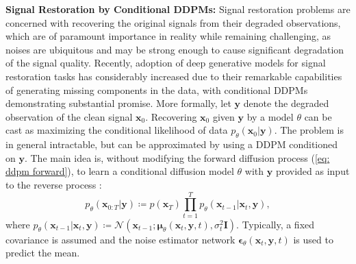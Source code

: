 \noindent\textbf{Signal Restoration by Conditional DDPMs:}
Signal restoration problems are concerned with recovering the original signals from their degraded observations, which are of paramount importance in reality while remaining challenging, as noises are ubiquitous and may be strong enough to cause significant degradation of the signal quality. Recently, adoption of deep generative models \citep{kingma2013auto,goodfellow2014generative,ho2020denoising} for signal restoration tasks has considerably increased due to their remarkable capabilities of generating missing components in the data, with conditional DDPMs \citep{croitoru2023diffusion,cao2024survey} demonstrating substantial promise. More formally, let $\mathbf{y}$ denote the degraded observation of the clean signal $\mathbf{x}_0$. Recovering $\mathbf{x}_0$ given $\mathbf{y}$ by a model $\theta$ can be cast as maximizing the conditional likelihood of data $p_\theta(\mathbf{x}_0|\mathbf{y})$. The problem is in general intractable, but can be approximated by using a DDPM conditioned on $\mathbf{y}$. The main idea is, without modifying the forward diffusion process (\ref{eq: ddpm forward}), to learn a conditional diffusion model $\theta$ with $\mathbf{y}$ provided as input to the reverse process \citep{ozdenizci2023restoring}:
\vspace{-0.2cm}
\begin{equation}
    p_\theta(\mathbf{x}_{0:T}|\mathbf{y})\coloneq p(\mathbf{x}_T)\prod_{t=1}^Tp_\theta(\mathbf{x}_{t-1}|\mathbf{x}_t,\mathbf{y}),
\label{eq: cddpm reverse}
\end{equation}
where $p_\theta(\mathbf{x}_{t-1}|\mathbf{x}_t,\mathbf{y})\coloneq\mathcal{N}(\mathbf{x}_{t-1};\boldsymbol{\mu}_\theta(\mathbf{x}_t,\mathbf{y},t), \sigma_t^2\mathbf{I})$.
Typically, a fixed covariance is assumed and the noise estimator network $\boldsymbol{\epsilon}_\theta(\mathbf{x}_t, \mathbf{y}, t)$ is used to predict the mean.
